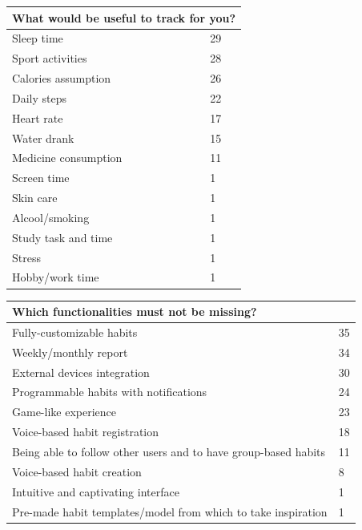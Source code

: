 \documentclass{article}
\begin{document}
\begin{table}[H]
    \centering
    \begin{tabularx}{0.9\textwidth}{X|p{1in}}
        \hline
        \multicolumn{2}{l}{\textbf{What would be useful to track for you?}} \\
        \hline
        Sleep time & 29 \\
        \hline
        Sport activities & 28 \\
        \hline
        Calories assumption & 26 \\
        \hline
        Daily steps & 22 \\
        \hline
        Heart rate & 17 \\
        \hline
        Water drank & 15 \\
        \hline
        Medicine consumption & 11 \\
        \hline
        Screen time & 1 \\
        \hline
        Skin care & 1 \\
        \hline
        Alcool/smoking & 1 \\
        \hline
        Study task and time & 1 \\
        \hline
        Stress & 1 \\
        \hline
        Hobby/work time & 1 \\
        \hline
    \end{tabularx}
\end{table}

\begin{table}[H]
    \centering
    \begin{tabularx}{0.9\textwidth}{X|p{1in}}
        \hline
        \multicolumn{2}{l}{\textbf{Which functionalities must not be missing?}} \\
        \hline
        Fully-customizable habits & 35 \\
        \hline
        Weekly/monthly report & 34 \\
        \hline
        External devices integration & 30 \\
        \hline
        Programmable habits with notifications & 24 \\
        \hline
        Game-like experience & 23 \\
        \hline
        Voice-based habit registration & 18 \\
        \hline
        Being able to follow other users and to have group-based habits & 11 \\
        \hline
        Voice-based habit creation & 8 \\
        \hline
        Intuitive and captivating interface & 1 \\
        \hline
        Pre-made habit templates/model from which to take inspiration & 1 \\
        \hline
    \end{tabularx}
\end{table}
\end{document}
